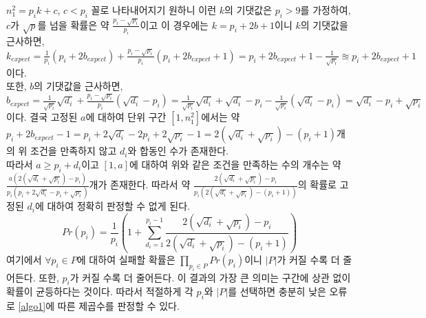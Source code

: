 \documentclass[a4paper]{article}
\begin{document}
        $n_{1}^{2} = p_{i}k + c$, $c < p_{i}$ 꼴로 나타내어지기 원하니 이런 $k$의 기댓값은 $p_{i} > 9$를 가정하여,
        $c$가 $\sqrt{p}$를 넘을 확률은 약 $\frac{p_{i} - \sqrt{p_{i}}}{p_{i}}$이고 이 경우에는 $k=p_{i} + 2b + 1$이니 $k$의 기댓값을 근사하면,
        $k_{expect}=\frac{1}{p_{i}}(p_{i} + 2b_{expect}) + \frac{p_{i} - \sqrt{p_{i}}}{p_{i}}(p_{i} + 2b_{expect} + 1)=p_{i} + 2b_{expect} + 1 - \frac{1}{\sqrt{p_{i}}} \approxeq p_{i} + 2b_{expect} + 1$이다. \\
        또한, $b$의 기댓값을 근사하면, $b_{expect} = \frac{1}{\sqrt{p_{i}}} \sqrt{d_{i}} + \frac{p_{i} - \sqrt{p_{i}}}{p_{i}} (\sqrt{d_{i}} - p_{i}) = \frac{1}{\sqrt{p_{i}}}\sqrt{d_{i}} + \sqrt{d_{i}} - p_{i} - \frac{1}{\sqrt{p_{i}}}(\sqrt{d_{i}} - p_{i}) = \sqrt{d_{i}} - p_{i} + \sqrt{p_{i}}$이다.
        결국 고정된 $a$에 대하여 단위 구간 $[1,n_{1}^{2}]$에서는 약 $p_{i} + 2b_{expect} - 1 = p_{i} + 2\sqrt{d_{i}} - 2p_{i} + 2\sqrt{p_{i}} - 1 = 2(\sqrt{d_{i}} + \sqrt{p_{i}}) - (p_{i} + 1)$개의 위 조건을 만족하지 않고 $d_{i}$와 합동인 수가 존재한다. \\
        따라서 $a \geq p_{i} + d_{i}$이고 $[1,a]$에 대하여 위와 같은 조건을 만족하는 수의 개수는 약 $\frac{a(2(\sqrt{d_{i}} + \sqrt{p_{i}}) - p_{i})}{p_{i}(p_{i}+2\sqrt{d_{i}}-p_{i}+\sqrt{p_{i}})}$개가 존재한다.
        따라서 약 $\frac{2(\sqrt{d_{i}} + \sqrt{p_{i}}) - p_{i}}{p_{i}(2(\sqrt{d_{i}} + \sqrt{p_{i}}) - (p_{i} + 1))}$의 확률로 고정된 $d_{i}$에 대하여 정확히 판정할 수 없게 된다.
        \begin{equation}
            Pr(p_{i}) = \frac{1}{p_{i}}(1 + \sum_{d_{i}=1}^{p_{i}-1} \frac{2(\sqrt{d_{i}} + \sqrt{p_{i}}) - p_{i}}{2(\sqrt{d_{i}} + \sqrt{p_{i}}) - (p_{i} + 1)})
        \end{equation}
        여기에서 $\forall p_{i} \in P$에 대하여 실패할 확률은 $\prod\nolimits_{p_{i} \in P} Pr(p_{i})$이니 $|P|$가 커질 수록 더 줄어든다.
        또한, $p_{i}$가 커질 수록 더 줄어든다.
        이 결과의 가장 큰 의미는 구간에 상관 없이 확률이 균등하다는 것이다.
        따라서 적절하게 각 $p_{i}$와 $|P|$를 선택하면 충분히 낮은 오류로 \ref{algo1}에 따른 제곱수를 판정할 수 있다.
\end{document}
